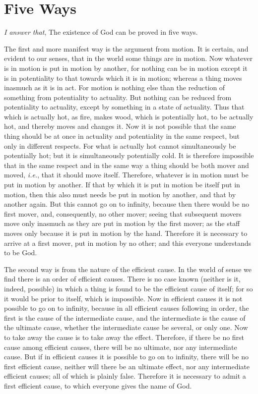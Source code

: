 
\author{Thomas Aquinas}
\chapter{Five Ways}

\textit{I answer that}, The existence of God can be proved in
five ways.

The first and more manifest way is the argument from motion. It is
certain, and evident to our senses, that in the world some things are
in motion. Now whatever is in motion is put in motion by another, for
nothing can be in motion except it is in potentiality to that towards
which it is in motion; whereas a thing moves inasmuch as it is in act.
For motion is nothing else than the reduction of something from
potentiality to actuality. But nothing can be reduced from
potentiality to actuality, except by something in a state of
actuality. Thus that which is actually hot, as fire, makes wood, which
is potentially hot, to be actually hot, and thereby moves and changes
it. Now it is not possible that the same thing should be at once in
actuality and potentiality in the same  respect, but only in
different respects. For what is actually hot cannot simultaneously be
potentially hot; but it is simultaneously potentially cold. It is
therefore impossible that in the same respect and in the same way a
thing should be both mover and moved, \textit{i.e.}, that it should
move itself. Therefore, whatever is in motion must be put in motion by
another. If that by which it is put in motion be itself put in motion,
then this also must needs be put in motion by another, and that by
another again. But this cannot go on to infinity, because then there
would be no first mover, and, consequently, no other mover; seeing
that subsequent movers move only inasmuch as they are put in motion by
the first mover; as the staff moves only because it is put in motion
by the hand. Therefore it is necessary to arrive at a first mover, put
in motion by no other; and this everyone understands to be God.

The second way is from the nature of the efficient cause. In the world
of sense we find there is an order of efficient causes. There is no
case known (neither is it, indeed, possible) in which a thing is found
to be the efficient cause of itself; for so it would be prior to
itself, which is impossible. Now in efficient causes it is not
possible to go on to infinity, because in all efficient causes
following in order, the first is the cause of the intermediate cause,
and the intermediate is the cause of the ultimate cause, whether the
intermediate cause be several, or only one. Now to take away the cause
is to take away the effect. Therefore, if there be no first cause
among efficient causes, there will be no ultimate, nor any
intermediate cause. But if in efficient causes it is possible to go on
to infinity, there will be no first efficient cause, neither will
there be an ultimate effect, nor any intermediate efficient causes;
all of which is plainly false. Therefore it is necessary to admit a
first efficient cause, to which everyone gives the name of God.

